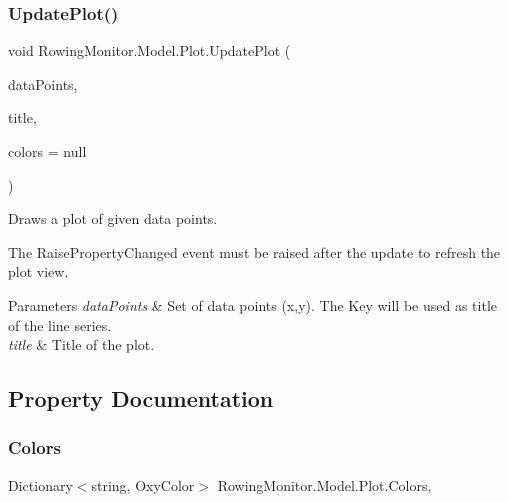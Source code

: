 \subsubsection{\texorpdfstring{Update\+Plot()}{UpdatePlot()}}
{\footnotesize\ttfamily void Rowing\+Monitor.\+Model.\+Plot.\+Update\+Plot (\begin{DoxyParamCaption}\item[{Dictionary$<$ String, List$<$ \hyperlink{struct_rowing_monitor_1_1_model_1_1_plot_data}{Plot\+Data} $>$$>$}]{data\+Points,  }\item[{String}]{title,  }\item[{Dictionary$<$ String, Oxy\+Color $>$}]{colors = {\ttfamily null} }\end{DoxyParamCaption})}



Draws a plot of given data points. 

The Raise\+Property\+Changed event must be raised after the update to refresh the plot view. 


\begin{DoxyParams}{Parameters}
{\em data\+Points} & Set of data points (x,y). The Key will be used as title of the line series.\\
\hline
{\em title} & Title of the plot.\\
\hline
\end{DoxyParams}


\subsection{Property Documentation}
\mbox{\label{class_rowing_monitor_1_1_model_1_1_plot_af5c811e7e98de0927650caede84921a5}} 
\subsubsection{\texorpdfstring{Colors}{Colors}}
{\footnotesize\ttfamily Dictionary$<$string, Oxy\+Color$>$ Rowing\+Monitor.\+Model.\+Plot.\+Colors\hspace{0.3cm}{\ttfamily [get]}, {\ttfamily [set]}}

\mbox{\label{class_rowing_monitor_1_1_model_1_1_plot_a702a4f703d9a9452dade1f19e91fc7a4}} 
